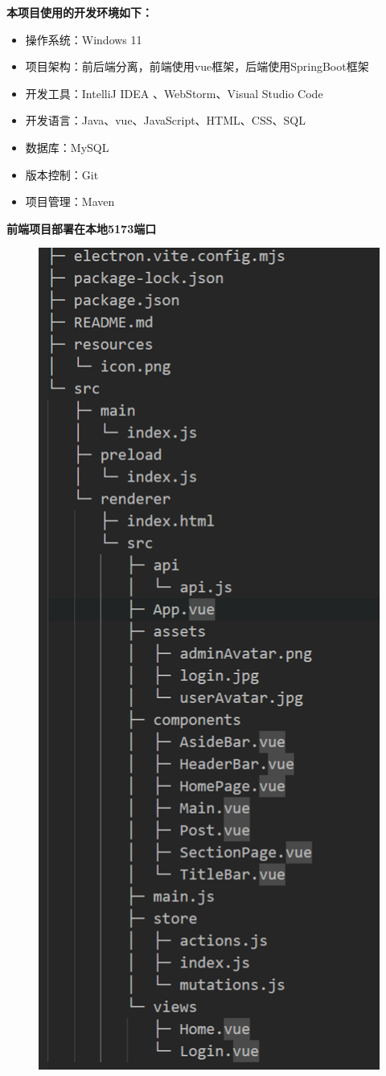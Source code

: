 \documentclass[UTF8]{ctexart}
\begin{document}
\textbf{本项目使用的开发环境如下：}
\begin{itemize}
  \item 操作系统：Windows 11
  \item 项目架构：前后端分离，前端使用vue框架，后端使用SpringBoot框架
  \item 开发工具：IntelliJ IDEA 、WebStorm、Visual Studio Code
  \item 开发语言：Java、vue、JavaScript、HTML、CSS、SQL
  \item 数据库：MySQL
  \item 版本控制：Git
  \item 项目管理：Maven
\end{itemize}


\textbf{前端项目部署在本地5173端口}

\begin{figure}[H]
  \centering
  \includegraphics[scale=0.3]{系统实现/前端项目结构.png}

\end{figure}
\end{document}
